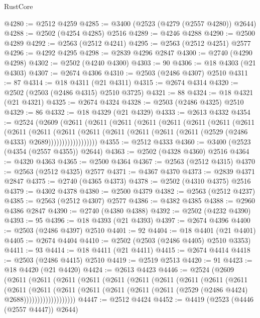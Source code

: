 \begin{lexlean}{RustCore}
\begin{coremodule}
@4280 := @2512 @4259
@4285 := @3400 (@2523 (@4279 (@2557 @4280)) @2644)
@4288 := @2502 (@4254 @4285) @2516
@4289 := @4246 @4288
@4290 := @2500 @4289
@4292 := @2563 (@2512 @4241)
@4295 := @2563 (@2512 @4251) @2577
@4296 := @4292 @4295
@4298 := @2839 @4296 @2847
@4300 := @2740 (@4290 @4298)
@4302 := @2502 (@4240 @4300)
@4303 := 90
@4306 := @18 @4303 (@21 @4303)
@4307 := @2674 @4306
@4310 := @2503 (@2486 @4307) @2510
@4311 := 87
@4314 := @18 @4311 (@21 @4311)
@4315 := @2674 @4314
@4320 := @2502 (@2503 (@2486 @4315) @2510 @3725)
@4321 := 88
@4324 := @18 @4321 (@21 @4321)
@4325 := @2674 @4324
@4328 := @2503 (@2486 @4325) @2510
@4329 := 86
@4332 := @18 @4329 (@21 @4329)
@4333 := @2613 @4332
@4354 := @2524
    (@2609
      (@2611
        (@2611
          (@2611
            (@2611
              (@2611
                (@2611
                  (@2611
                    (@2611
                      (@2611
                        (@2611
                          (@2611
                            (@2611
                              (@2611
                                (@2611 (@2611 (@2611 (@2529 (@2486 @4333) @2689))))))))))))))))))
@4355 := @2512 @4333
@4360 := @3400 (@2523 (@4354 (@2557 @4355)) @2644)
@4363 := @2502 (@4328 @4360) @2516
@4364 := @4320 @4363
@4365 := @2500 @4364
@4367 := @2563 (@2512 @4315)
@4370 := @2563 (@2512 @4325) @2577
@4371 := @4367 @4370
@4373 := @2839 @4371 @2847
@4375 := @2740 (@4365 @4373)
@4378 := @2502 (@4310 @4375) @2516
@4379 := @4302 @4378
@4380 := @2500 @4379
@4382 := @2563 (@2512 @4237)
@4385 := @2563 (@2512 @4307) @2577
@4386 := @4382 @4385
@4388 := @2960 @4386 @2847
@4390 := @2740 (@4380 @4388)
@4392 := @2502 (@4232 @4390)
@4393 := 95
@4396 := @18 @4393 (@21 @4393)
@4397 := @2674 @4396
@4400 := @2503 (@2486 @4397) @2510
@4401 := 92
@4404 := @18 @4401 (@21 @4401)
@4405 := @2674 @4404
@4410 := @2502 (@2503 (@2486 @4405) @2510 @3353)
@4411 := 93
@4414 := @18 @4411 (@21 @4411)
@4415 := @2674 @4414
@4418 := @2503 (@2486 @4415) @2510
@4419 := @2519 @2513
@4420 := 91
@4423 := @18 @4420 (@21 @4420)
@4424 := @2613 @4423
@4446 := @2524
    (@2609
      (@2611
        (@2611
          (@2611
            (@2611
              (@2611
                (@2611
                  (@2611
                    (@2611
                      (@2611
                        (@2611
                          (@2611
                            (@2611
                              (@2611
                                (@2611
                                  (@2611 (@2611 (@2611 (@2529 (@2486 @4424) @2688)))))))))))))))))))
@4447 := @2512 @4424
@4452 := @4419 (@2523 (@4446 (@2557 @4447)) @2644)

\end{coremodule}
\end{lexlean}
